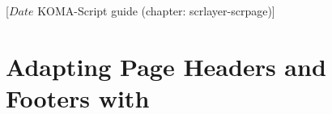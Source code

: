 %
%
%
%
%
%
%
%
% 
%
%
%
%

%
                 [$Date$
                  KOMA-Script guide (chapter: scrlayer-scrpage)]


\chapter[{Adapting Page Headers and Footers with \Package{scrlayer-scrpage}}]
  {Adapting Page Headers and
  Footers with }
%
%

